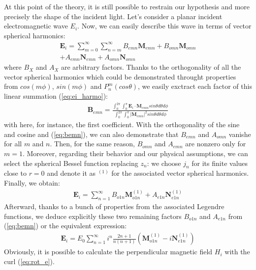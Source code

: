 \documentclass{article}
\begin{document}
At this point of the theory, it is still possible to restrain our hypothesis and more precisely the shape of the incident light. Let's consider a planar incident electromagnetic wave $E_{i}$. Now, we can easily describe this wave in terms of vector spherical harmonics:
\begin{equation}\label{eq:ei_harmo}
\begin{aligned}
    \textbf{E}_{i}=\sum_{m=0}^{\infty }\sum_{n=m}^{\infty }B_{emn}\textbf{M}_{emn}+B_{omn}\textbf{M}_{omn}\\
+A_{emn}\textbf{N}_{emn}+A_{omn}\textbf{N}_{omn}
\end{aligned}
\end{equation}
where $B_{X}$ and $A_{X}$ are arbitrary factors. Thanks to the orthogonality of all the vector spherical harmonics which could be demonstrated throught properties from $cos(m\phi)$, $sin(m\phi)$ and $P_{n}^{m}(cos\theta)$, we easily exctract each factor of this linear summation (\ref{eq:ei_harmo}):
\begin{align}\label{eq:bemn}
\textbf{B}_{emn}=\frac{\int_{0}^{2\pi}\int_{0}^{\pi}\textbf{E}_{i}\cdot \textbf{M}_{emn}sin\theta d\theta d\phi}{\int_{0}^{2\pi}\int_{0}^{\pi}|\textbf{M}_{emn}|^{2}sin\theta d\theta d\phi}
\end{align}
with here, for instance, the first coefficient. With the orthogonality of the sine and cosine and (\ref{eq:bemn}), we can also demonstrate that $B_{emn}$ and $A_{omn}$ vanishe for all $m$ and $n$. Then, for the same reason, $B_{omn}$ and $A_{emn}$ are nonzero only for $m=1$. Moreover, regarding their behavior and our physical assumptions, we can select the spherical Bessel function replacing $z_{n}$: we choose $j_{n}$ for its finite values close to $r=0$ and denote it as $^{(1)}$ for the associated vector spherical harmonics. Finally, we obtain:
\begin{align}
\textbf{E}_{i}=\sum_{n=1}^{\infty }B_{o1n}\textbf{M}^{(1)}_{o1n} + A_{e1n}\textbf{N}^{(1)}_{e1n}
\end{align}
Afterward, thanks to a bunch of properties from the associated Legendre functions, we deduce explicitly these two remaining factors $B_{o1n}$ and $A_{e1n}$ from (\ref{eq:bemn}) or the equivalent expression:
\begin{align}
\textbf{E}_{i}=E_{0}\sum_{n=1}^{\infty }i^{n}\frac{2n+1}{n(n+1)}(\textbf{M}^{(1)}_{o1n} - i\textbf{N}^{(1)}_{e1n})
\end{align}
Obviously, it is possible to calculate the perpendicular magnetic field $H_{i}$ with the curl (\ref{eq:rot_e}).
\end{document}
